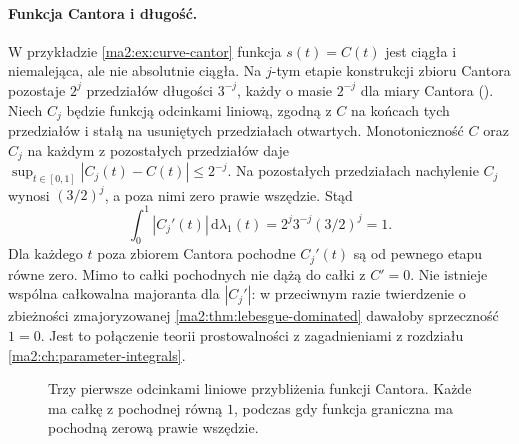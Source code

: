 \paragraph{Funkcja Cantora i długość.}
W przykładzie \ref{ma2:ex:curve-cantor}
funkcja $s(t)=C(t)$ jest ciągła i niemalejąca,
ale nie absolutnie ciągła. Na $j$-tym etapie
konstrukcji zbioru Cantora pozostaje $2^j$
przedziałów długości $3^{-j}$, każdy o masie
$2^{-j}$ dla miary Cantora
().
Niech $C_j$ będzie funkcją odcinkami liniową,
zgodną z $C$ na końcach tych przedziałów
i stałą na usuniętych przedziałach otwartych.
Monotoniczność $C$ oraz $C_j$ na każdym
z pozostałych przedziałów daje
$\sup_{t\in[0,1]}|C_j(t)-C(t)|\le2^{-j}$.
Na pozostałych przedziałach nachylenie
$C_j$ wynosi $(3/2)^j$, a poza nimi zero
prawie wszędzie. Stąd
\[
 \int_0^1 |C_j'(t)|\,\mathrm d\lambda_1(t)
 =2^j3^{-j}(3/2)^j=1.
\]
Dla każdego $t$ poza zbiorem Cantora
pochodne $C_j'(t)$ są od pewnego etapu
równe zero. Mimo to całki pochodnych
nie dążą do całki z $C'=0$.
Nie istnieje wspólna całkowalna majoranta
dla $|C_j'|$: w przeciwnym razie twierdzenie
o zbieżności zmajoryzowanej
\ref{ma2:thm:lebesgue-dominated}
dawałoby sprzeczność $1=0$.
Jest to połączenie teorii prostowalności
z zagadnieniami z rozdziału
\ref{ma2:ch:parameter-integrals}.

\begin{figure}[htbp]
\centering
{}
\caption{Trzy pierwsze odcinkami liniowe
przybliżenia funkcji Cantora. Każde ma
całkę z pochodnej równą $1$, podczas gdy
funkcja graniczna ma pochodną zerową
prawie wszędzie.}
\label{ma2:fig:curve-cantor-approximations}
\end{figure}


